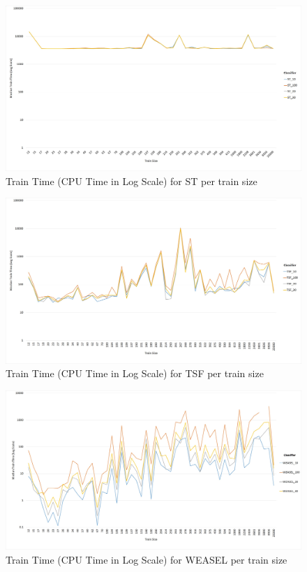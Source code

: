   \begin{figure} [!htb]
    \centering
    \includegraphics[width=\textwidth]{./Chapters/06 Results/Duration_st_train_size.jpg}
    \caption{Train Time (CPU Time in Log Scale) for ST per train size}
  \end{figure}
  
  \begin{figure} [!htb]
    \centering
    \includegraphics[width=\textwidth]{./Chapters/06 Results/Duration_tsf_train_size.jpg}
    \caption{Train Time (CPU Time in Log Scale) for TSF per train size}
  \end{figure}

  \begin{figure} [!htb]
    \centering
    \includegraphics[width=\textwidth]{./Chapters/06 Results/Duration_weasel_train_size.jpg}
    \caption{Train Time (CPU Time in Log Scale) for WEASEL per train size}
  \end{figure}

